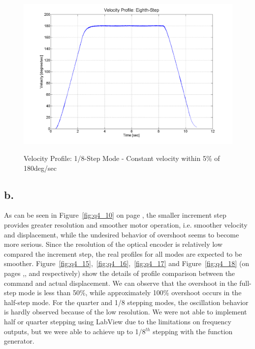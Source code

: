 \documentclass{article}
\theoremstyle{plain}
\theoremstyle{definition}
\theoremstyle{remark}
\begin{document}
\begin{figure}[h!]
\begin{center}
\includegraphics[width=12cm]{Q4_eighth_step.png}
\caption{Velocity Profile: 1/8-Step Mode - Constant velocity within 5\% of 180deg/sec} \label{tex}
\label{fig:q4_14}
\end{center}
\end{figure}

\clearpage

\subsection*{b.}

As can be seen in Figure~\ref{fig:q4_10} on page \pageref{fig:q4_10}, the smaller increment step provides greater resolution and smoother motor operation, i.e. smoother velocity and displacement, while the undesired behavior of overshoot seems to become more serious. Since the resolution of the optical encoder is relatively low compared the increment step, the real profiles for all modes are expected to be smoother. Figure~\ref{fig:q4_15},~\ref{fig:q4_16},~\ref{fig:q4_17} and Figure~\ref{fig:q4_18} (on pages \pageref{fig:q4_15},\pageref{fig:q4_16},\pageref{fig:q4_17} and \pageref{fig:q4_18} respectively) show the details of profile comparison between the command and actual displacement. We can observe that the overshoot in the full-step mode is less than 50\%, while approximately 100\% overshoot occurs in the half-step mode. For the quarter and 1/8 stepping modes, the oscillation behavior is hardly observed because of the low resolution. We were not able to implement half or quarter stepping using LabView due to the limitations on frequency outputs, but we were able to achieve up to 1/8$^{th}$ stepping with the function generator. \\
\end{document}
